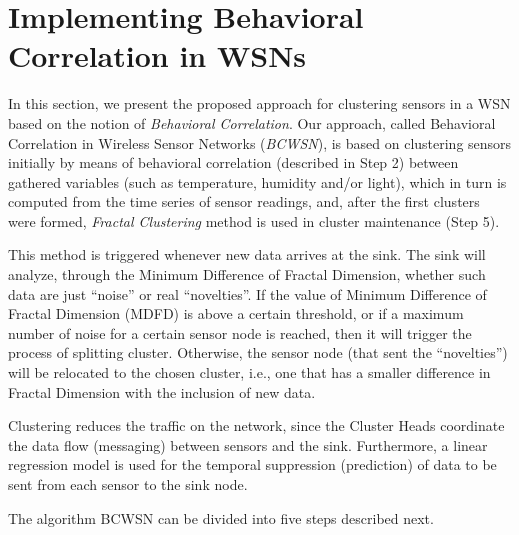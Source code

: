 \documentclass{acm_proc_article-sp}
\begin{document}
\section{Implementing Behavioral Correlation in WSNs}
\label{implementing-bcwsn}

In this section, we present the proposed approach for clustering sensors in a
WSN based on the notion of {\it Behavioral Correlation}. Our approach, called
Behavioral Correlation in Wireless Sensor Networks (\textit{BCWSN}),
is based on clustering sensors initially by means of behavioral correlation
(described in Step 2) between gathered variables (such as temperature, humidity 
and/or light), which in turn is computed from the time series
of sensor readings, and, after the first clusters were formed, \textit{Fractal
Clustering} method is used in cluster maintenance (Step 5).
\vspace*{-.3cm}

This method is triggered whenever new data arrives at the sink.
The sink will analyze, through the Minimum Difference of Fractal Dimension,
whether such data are just ``noise'' or real ``novelties''. If the
value of Minimum Difference of Fractal Dimension (MDFD) is above a certain threshold, or
if a maximum number of noise for a certain sensor node is reached, then it
will trigger the process of splitting cluster. Otherwise, the sensor node
(that sent the ``novelties'') will be relocated to the chosen cluster, i.e., one that
has a smaller difference in Fractal Dimension with the inclusion of new data.
\vspace*{-.3cm}

Clustering reduces the traffic on the network, since the Cluster Heads
coordinate the data flow (messaging) between sensors and the sink.
Furthermore, a linear regression model is used for the temporal suppression
(prediction) of data to be sent from each sensor to the sink node.
\vspace*{-.3cm}

The algorithm BCWSN can be divided into five steps described next.
\vspace*{-.3cm}
\end{document}
